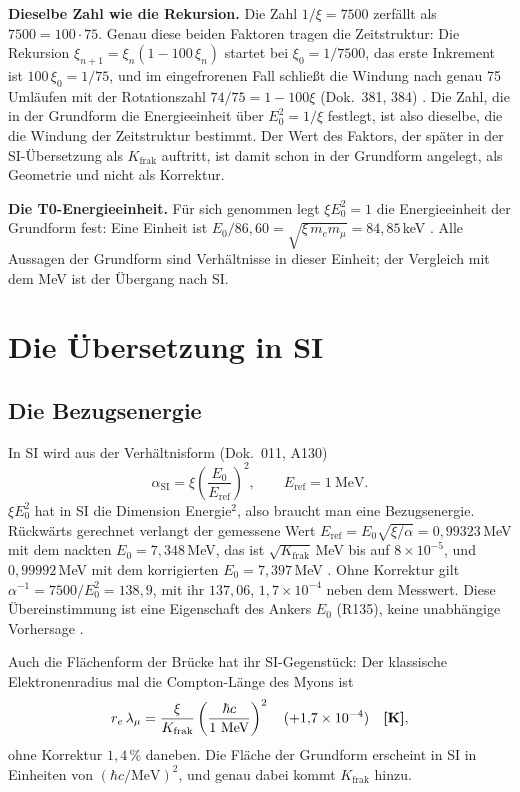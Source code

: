 \textbf{Dieselbe Zahl wie die Rekursion.} Die Zahl $1/\xi=7500$ zerfällt als $7500=100\cdot75$.
Genau diese beiden Faktoren tragen die Zeitstruktur: Die Rekursion
$\xi_{n+1}=\xi_n(1-100\,\xi_n)$ startet bei $\xi_0=1/7500$, das erste Inkrement ist
$100\,\xi_0=1/75$, und im eingefrorenen Fall schließt die Windung nach genau 75 Umläufen mit der
Rotationszahl $74/75=1-100\xi$ (Dok.~381, 384) \BM. Die Zahl, die in der Grundform die
Energieeinheit über $E_0^2=1/\xi$ festlegt, ist also dieselbe, die die Windung der Zeitstruktur
bestimmt. Der Wert des Faktors, der später in der SI-Übersetzung als $K_{\text{frak}}$ auftritt,
ist damit schon in der Grundform angelegt, als Geometrie und nicht als Korrektur.

\textbf{Die T0-Energieeinheit.} Für sich genommen legt $\xi E_0^2=1$ die Energieeinheit der
Grundform fest: Eine Einheit ist $E_0/86{,}60=\sqrt{\xi\,m_em_\mu}=84{,}85$\,keV \KM. Alle
Aussagen der Grundform sind Verhältnisse in dieser Einheit; der Vergleich mit dem MeV ist der
Übergang nach SI.

\section{Die Übersetzung in SI}

\subsection{Die Bezugsenergie}

In SI wird aus der Verhältnisform (Dok.~011, A130)
\begin{equation}
  \alpha_{\text{SI}}=\xi\left(\frac{E_0}{E_{\text{ref}}}\right)^2,\qquad E_{\text{ref}}=1\ \text{MeV}.
\end{equation}
$\xi E_0^2$ hat in SI die Dimension Energie$^2$, also braucht man eine Bezugsenergie. Rückwärts
gerechnet verlangt der gemessene Wert $E_{\text{ref}}=E_0\sqrt{\xi/\alpha}=0{,}99323$\,MeV mit
dem nackten $E_0=7{,}348$\,MeV, das ist $\sqrt{K_{\text{frak}}}$\,MeV bis auf $8\times10^{-5}$,
und $0{,}99992$\,MeV mit dem korrigierten $E_0=7{,}397$\,MeV \KM. Ohne Korrektur gilt
$\alpha^{-1}=7500/E_0^2=138{,}9$, mit ihr $137{,}06$, $1{,}7\times10^{-4}$ neben dem Messwert.
Diese Übereinstimmung ist eine Eigenschaft des Ankers $E_0$ (R135), keine unabhängige
Vorhersage \KM.

Auch die Flächenform der Brücke hat ihr SI-Gegenstück: Der klassische Elektronenradius mal die
Compton-Länge des Myons ist
\begin{equation}
  r_e\,\lambda_\mu=\frac{\xi}{K_{\text{frak}}}\left(\frac{\hbar c}{1\ \text{MeV}}\right)^2
  \quad(+1{,}7\times10^{-4})\quad\textbf{[K]} ,
\end{equation}
ohne Korrektur $1{,}4\,\%$ daneben. Die Fläche der Grundform erscheint in SI in Einheiten von
$(\hbar c/\text{MeV})^2$, und genau dabei kommt $K_{\text{frak}}$ hinzu.

